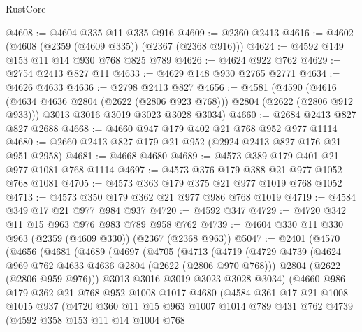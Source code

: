 \begin{lexlean}{RustCore}
\begin{coremodule}
@4608 := @4604 @335 @11 @335 @916
@4609 := @2360 @2413
@4616 := @4602 (@4608 (@2359 (@4609 @335)) (@2367 (@2368 @916)))
@4624 := @4592 @149 @153 @11 @14 @930 @768 @825 @789
@4626 := @4624 @922 @762
@4629 := @2754 @2413 @827 @11
@4633 := @4629 @148 @930 @2765 @2771
@4634 := @4626 @4633
@4636 := @2798 @2413 @827
@4656 := @4581
    (@4590
      (@4616 (@4634 @4636 @2804 (@2622 (@2806 @923 @768))) @2804 (@2622 (@2806 @912 @933)))
      @3013
      @3016
      @3019
      @3023
      @3028
      @3034)
@4660 := @2684 @2413 @827 @827 @2688
@4668 := @4660 @947 @179 @402 @21 @768 @952 @977 @1114
@4680 := @2660 @2413 @827 @179 @21 @952 (@2924 @2413 @827 @176 @21 @951 @2958)
@4681 := @4668 @4680
@4689 := @4573 @389 @179 @401 @21 @977 @1081 @768 @1114
@4697 := @4573 @376 @179 @388 @21 @977 @1052 @768 @1081
@4705 := @4573 @363 @179 @375 @21 @977 @1019 @768 @1052
@4713 := @4573 @350 @179 @362 @21 @977 @986 @768 @1019
@4719 := @4584 @349 @17 @21 @977 @984 @937
@4720 := @4592 @347
@4729 := @4720 @342 @11 @15 @963 @976 @983 @789 @958 @762
@4739 := @4604 @330 @11 @330 @963 (@2359 (@4609 @330)) (@2367 (@2368 @963))
@5047 := @2401
    (@4570
      (@4656
        (@4681
          (@4689
            (@4697
              (@4705
                (@4713
                  (@4719
                    (@4729
                      @4739
                      (@4624 @969 @762 @4633 @4636 @2804 (@2622 (@2806 @970 @768)))
                      @2804
                      (@2622 (@2806 @959 @976)))
                    @3013
                    @3016
                    @3019
                    @3023
                    @3028
                    @3034)
                  (@4660
                    @986
                    @179
                    @362
                    @21
                    @768
                    @952
                    @1008
                    @1017
                    @4680
                    (@4584
                      @361
                      @17
                      @21
                      @1008
                      @1015
                      @937
                      (@4720
                        @360
                        @11
                        @15
                        @963
                        @1007
                        @1014
                        @789
                        @431
                        @762
                        @4739
                        (@4592
                          @358
                          @153
                          @11
                          @14
                          @1004
                          @768

\end{coremodule}
\end{lexlean}

